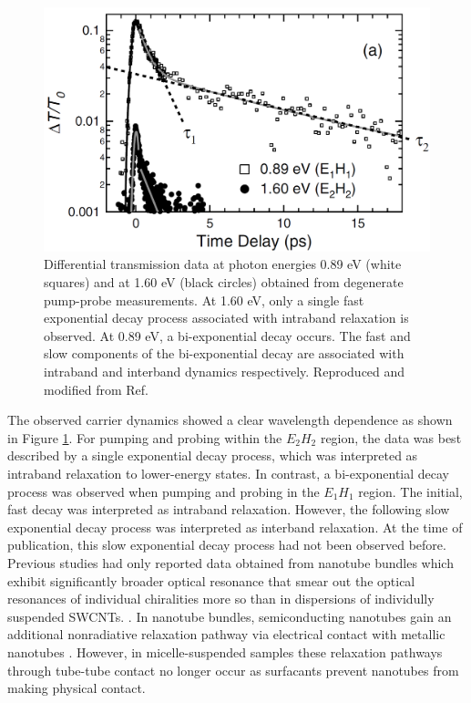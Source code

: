 \begin{figure}[ht]
	\centering
	\includegraphics[scale=0.3]{images/chapter_prior_works/dtt_gordana}
	\caption{Differential transmission data at photon energies 0.89 eV (white squares) and at 1.60 eV (black circles) obtained from degenerate pump-probe measurements. At 1.60 eV, only a single fast exponential decay process associated with intraband relaxation is observed. At 0.89 eV, a bi-exponential decay occurs. The fast and slow components of the bi-exponential decay are associated with intraband and interband dynamics respectively. Reproduced and modified from Ref.\ \cite{ostojic2004interband}}
	\label{fig:dtt_gordana}
\end{figure}

The observed carrier dynamics showed a clear wavelength dependence as shown in Figure \ref{fig:dtt_gordana}. For pumping and probing within the $E_2 H_2$ region, the data was best described by a single exponential decay process, which was interpreted as intraband relaxation to lower-energy states. In contrast, a bi-exponential decay process was observed when pumping and probing in the $E_1 H_1$ region. The initial, fast decay was interpreted as intraband relaxation. However, the following slow exponential decay process was interpreted as interband relaxation. At the time of publication, this slow exponential decay process had not been observed before. Previous studies had only reported data obtained from nanotube bundles which exhibit significantly broader optical resonance that smear out the optical resonances of individual chiralities more so than in dispersions of individully suspended SWCNTs. \cite{ostojic2004interband}. In nanotube bundles, semiconducting nanotubes gain an additional nonradiative relaxation pathway via electrical contact with metallic nanotubes \cite{maeda2006gigantic}. However, in micelle-suspended samples these relaxation pathways through tube-tube contact no longer occur as surfacants prevent nanotubes from making physical contact.

